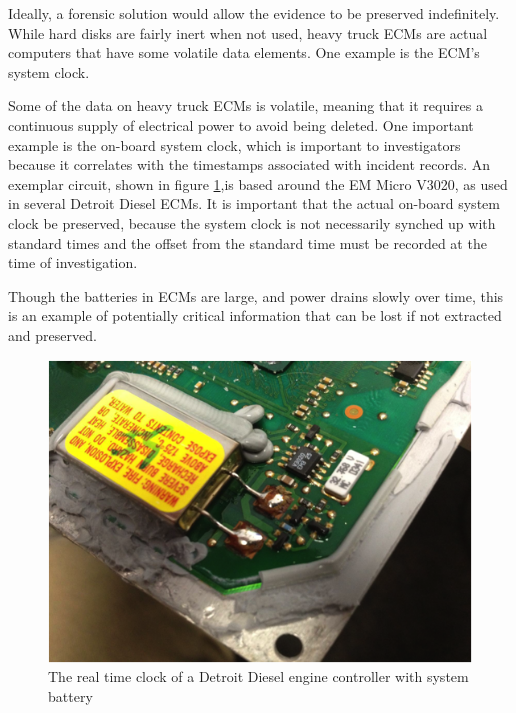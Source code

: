 Ideally, a forensic solution would allow the evidence to be preserved indefinitely. While hard disks are fairly inert when not used, heavy truck ECMs are actual computers that 
have some volatile data elements. One example is the ECM's system clock.

Some of the data on heavy truck ECMs is volatile, meaning that it requires a continuous supply of electrical power to avoid being deleted. One important example is the on-board 
system clock, which is important to investigators because it correlates with the timestamps associated with incident records. An exemplar circuit, shown in figure \ref{fig:clockbatt},is based around 
the EM Micro V3020, as used in several Detroit Diesel ECMs.  It is important that the actual on-board system clock be preserved, because the system clock is not necessarily synched 
up with standard times and the offset from the standard time must be recorded at the time of investigation.

Though the batteries in ECMs are large, and power drains slowly over time, this is an example of potentially critical information that can be lost if not extracted and preserved.

\begin{figure}[h]
  \centering
  \includegraphics{clockbatt}
  \caption{The real time clock of a Detroit Diesel engine controller with system battery}
  \label{fig:clockbatt}

\end{figure}
